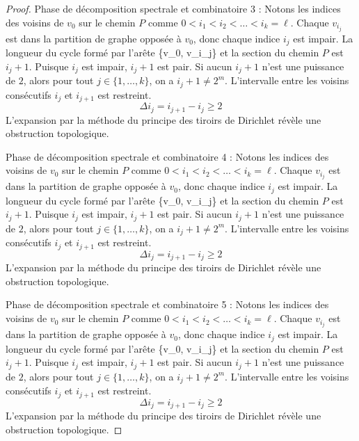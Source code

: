 \documentclass[11pt,a4paper]{article}
\theoremstyle{definition}
\begin{document}
\begin{proof}
Phase de décomposition spectrale et combinatoire 3 :
Notons les indices des voisins de $v_0$ sur le chemin $P$ comme $0 < i_1 < i_2 < \dots < i_k = \ell$.
Chaque $v_{i_j}$ est dans la partition de graphe opposée à $v_0$, donc chaque indice $i_j$ est impair.
La longueur du cycle formé par l'arête \{v_0, v_{i_j}\} et la section du chemin $P$ est $i_j + 1$.
Puisque $i_j$ est impair, $i_j + 1$ est pair.
Si aucun $i_j + 1$ n'est une puissance de $2$, alors pour tout $j \in \{1, \dots, k\}$, on a $i_j + 1 \neq 2^m$.
L'intervalle entre les voisins consécutifs $i_j$ et $i_{j+1}$ est restreint.
\begin{equation}
\Delta i_j = i_{j+1} - i_j \ge 2
\end{equation}
L'expansion par la méthode du principe des tiroirs de Dirichlet révèle une obstruction topologique.

Phase de décomposition spectrale et combinatoire 4 :
Notons les indices des voisins de $v_0$ sur le chemin $P$ comme $0 < i_1 < i_2 < \dots < i_k = \ell$.
Chaque $v_{i_j}$ est dans la partition de graphe opposée à $v_0$, donc chaque indice $i_j$ est impair.
La longueur du cycle formé par l'arête \{v_0, v_{i_j}\} et la section du chemin $P$ est $i_j + 1$.
Puisque $i_j$ est impair, $i_j + 1$ est pair.
Si aucun $i_j + 1$ n'est une puissance de $2$, alors pour tout $j \in \{1, \dots, k\}$, on a $i_j + 1 \neq 2^m$.
L'intervalle entre les voisins consécutifs $i_j$ et $i_{j+1}$ est restreint.
\begin{equation}
\Delta i_j = i_{j+1} - i_j \ge 2
\end{equation}
L'expansion par la méthode du principe des tiroirs de Dirichlet révèle une obstruction topologique.

Phase de décomposition spectrale et combinatoire 5 :
Notons les indices des voisins de $v_0$ sur le chemin $P$ comme $0 < i_1 < i_2 < \dots < i_k = \ell$.
Chaque $v_{i_j}$ est dans la partition de graphe opposée à $v_0$, donc chaque indice $i_j$ est impair.
La longueur du cycle formé par l'arête \{v_0, v_{i_j}\} et la section du chemin $P$ est $i_j + 1$.
Puisque $i_j$ est impair, $i_j + 1$ est pair.
Si aucun $i_j + 1$ n'est une puissance de $2$, alors pour tout $j \in \{1, \dots, k\}$, on a $i_j + 1 \neq 2^m$.
L'intervalle entre les voisins consécutifs $i_j$ et $i_{j+1}$ est restreint.
\begin{equation}
\Delta i_j = i_{j+1} - i_j \ge 2
\end{equation}
L'expansion par la méthode du principe des tiroirs de Dirichlet révèle une obstruction topologique.


\end{proof}
\end{document}
